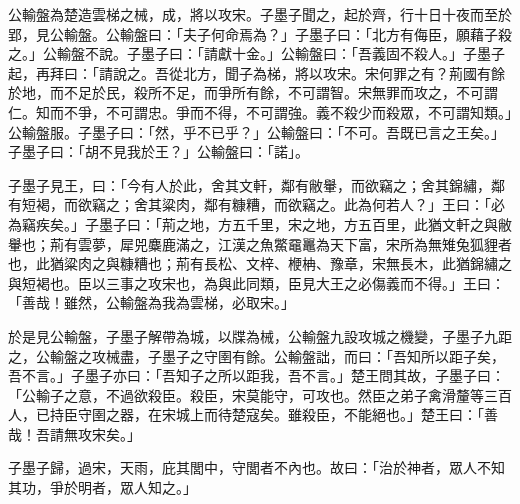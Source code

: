
\begin{pinyinscope}
公輸盤為楚造雲梯之械，成，將以攻宋。子墨子聞之，起於齊，行十日十夜而至於郢，見公輸盤。公輸盤曰：「夫子何命焉為？」子墨子曰：「北方有侮臣，願藉子殺之。」公輸盤不說。子墨子曰：「請獻十金。」公輸盤曰：「吾義固不殺人。」子墨子起，再拜曰：「請說之。吾從北方，聞子為梯，將以攻宋。宋何罪之有？荊國有餘於地，而不足於民，殺所不足，而爭所有餘，不可謂智。宋無罪而攻之，不可謂仁。知而不爭，不可謂忠。爭而不得，不可謂強。義不殺少而殺眾，不可謂知類。」公輸盤服。子墨子曰：「然，乎不已乎？」公輸盤曰：「不可。吾既已言之王矣。」子墨子曰：「胡不見我於王？」公輸盤曰：「諾」。

子墨子見王，曰：「今有人於此，舍其文軒，鄰有敝轝，而欲竊之；舍其錦繡，鄰有短褐，而欲竊之；舍其粱肉，鄰有糠糟，而欲竊之。此為何若人？」王曰：「必為竊疾矣。」子墨子曰：「荊之地，方五千里，宋之地，方五百里，此猶文軒之與敝轝也；荊有雲夢，犀兕麋鹿滿之，江漢之魚鱉黿鼉為天下富，宋所為無雉兔狐貍者也，此猶粱肉之與糠糟也；荊有長松、文梓、楩柟、豫章，宋無長木，此猶錦繡之與短褐也。臣以三事之攻宋也，為與此同類，臣見大王之必傷義而不得。」王曰：「善哉！雖然，公輸盤為我為雲梯，必取宋。」

於是見公輸盤，子墨子解帶為城，以牒為械，公輸盤九設攻城之機變，子墨子九距之，公輸盤之攻械盡，子墨子之守圉有餘。公輸盤詘，而曰：「吾知所以距子矣，吾不言。」子墨子亦曰：「吾知子之所以距我，吾不言。」楚王問其故，子墨子曰：「公輸子之意，不過欲殺臣。殺臣，宋莫能守，可攻也。然臣之弟子禽滑釐等三百人，已持臣守圉之器，在宋城上而待楚寇矣。雖殺臣，不能絕也。」楚王曰：「善哉！吾請無攻宋矣。」

子墨子歸，過宋，天雨，庇其閭中，守閭者不內也。故曰：「治於神者，眾人不知其功，爭於明者，眾人知之。」


\end{pinyinscope}